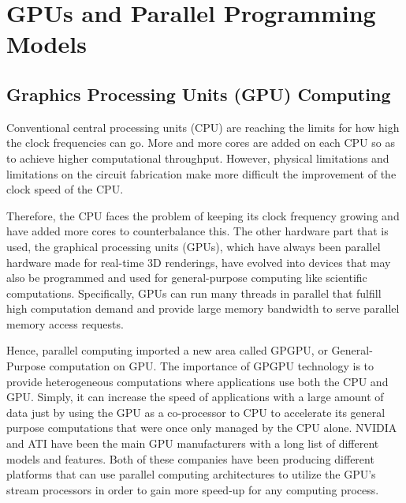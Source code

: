 \chapter{GPUs and Parallel Programming Models}


\section{Graphics Processing Units (GPU) Computing}

Conventional central processing units (CPU) are reaching the limits for how high the clock frequencies can go. More and more cores are added on each CPU so as to achieve higher computational throughput. However, physical limitations and limitations on the circuit fabrication make more difficult the improvement of the clock speed of the CPU.

Therefore, the CPU faces the problem of keeping its clock frequency growing and have added more cores to counterbalance this. The other hardware part that is used, the graphical processing units (GPUs), which have always been parallel hardware made for real-time 3D renderings, have evolved into devices that may also be programmed and used for general-purpose computing like scientific computations. Specifically, GPUs can run many threads in parallel that fulfill high computation demand and provide large memory bandwidth to serve parallel memory access requests.

Hence, parallel computing imported a new area called GPGPU, or General-Purpose computation on GPU. The importance of GPGPU technology is to provide heterogeneous computations where applications use both the CPU and GPU. Simply, it can increase the speed of applications with a large amount of data just by using the GPU as a co-processor to CPU to accelerate its general purpose computations that were once only managed by the CPU alone. NVIDIA and ATI have been the main GPU manufacturers with a long list of different models and features. Both of these companies have been producing different platforms that can use parallel computing architectures to utilize the GPU’s stream processors in order to gain more speed-up for any computing process. 

